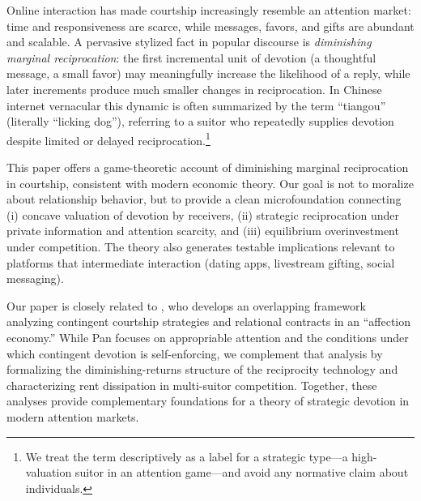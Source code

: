 \documentclass[AER]{AEA}
\begin{document}


Online interaction has made courtship increasingly resemble an attention market: time and
responsiveness are scarce, while messages, favors, and gifts are abundant and scalable.
A pervasive stylized fact in popular discourse is \textit{diminishing marginal
reciprocation}: the first incremental unit of devotion (a thoughtful message, a small
favor) may meaningfully increase the likelihood of a reply, while later increments produce
much smaller changes in reciprocation. In Chinese internet vernacular this dynamic is
often summarized by the term ``tiangou'' (literally ``licking dog''), referring to a
suitor who repeatedly supplies devotion despite limited or delayed
reciprocation.\footnote{We treat the term descriptively as a label for a strategic
type---a high-valuation suitor in an attention game---and avoid any normative claim about
individuals.}

This paper offers a game-theoretic account of diminishing marginal reciprocation in
courtship, consistent with modern economic theory. Our goal is not to moralize about
relationship behavior, but to provide a clean microfoundation connecting (i) concave
valuation of devotion by receivers, (ii) strategic reciprocation under private information
and attention scarcity, and (iii) equilibrium overinvestment under competition. The theory
also generates testable implications relevant to platforms that intermediate interaction
(dating apps, livestream gifting, social messaging).

Our paper is closely related to \citet{Price2026}, who develops an overlapping framework
analyzing contingent courtship strategies and relational contracts in an ``affection
economy.'' While Pan focuses on appropriable attention and the conditions under which
contingent devotion is self-enforcing, we complement that analysis by formalizing the
diminishing-returns structure of the reciprocity technology and characterizing rent
dissipation in multi-suitor competition. Together, these analyses provide complementary
foundations for a theory of strategic devotion in modern attention markets.
\end{document}
